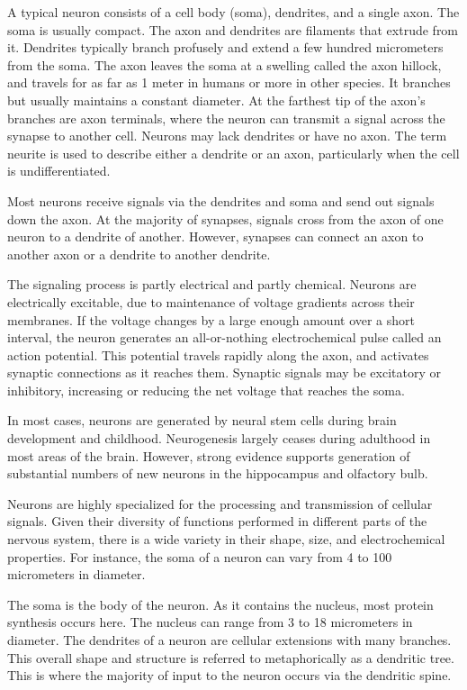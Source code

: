 A typical neuron consists of a cell body (soma), dendrites, and a single axon. The soma is usually compact. The axon and dendrites are filaments that extrude from it. Dendrites typically branch profusely and extend a few hundred micrometers from the soma. The axon leaves the soma at a swelling called the axon hillock, and travels for as far as 1 meter in humans or more in other species. It branches but usually maintains a constant diameter. At the farthest tip of the axon's branches are axon terminals, where the neuron can transmit a signal across the synapse to another cell. Neurons may lack dendrites or have no axon. The term neurite is used to describe either a dendrite or an axon, particularly when the cell is undifferentiated.

Most neurons receive signals via the dendrites and soma and send out signals down the axon. At the majority of synapses, signals cross from the axon of one neuron to a dendrite of another. However, synapses can connect an axon to another axon or a dendrite to another dendrite.

The signaling process is partly electrical and partly chemical. Neurons are electrically excitable, due to maintenance of voltage gradients across their membranes. If the voltage changes by a large enough amount over a short interval, the neuron generates an all-or-nothing electrochemical pulse called an action potential. This potential travels rapidly along the axon, and activates synaptic connections as it reaches them. Synaptic signals may be excitatory or inhibitory, increasing or reducing the net voltage that reaches the soma.

In most cases, neurons are generated by neural stem cells during brain development and childhood. Neurogenesis largely ceases during adulthood in most areas of the brain. However, strong evidence supports generation of substantial numbers of new neurons in the hippocampus and olfactory bulb.

Neurons are highly specialized for the processing and transmission of cellular signals. Given their diversity of functions performed in different parts of the nervous system, there is a wide variety in their shape, size, and electrochemical properties. For instance, the soma of a neuron can vary from 4 to 100 micrometers in diameter.

The soma is the body of the neuron. As it contains the nucleus, most protein synthesis occurs here. The nucleus can range from 3 to 18 micrometers in diameter.
The dendrites of a neuron are cellular extensions with many branches. This overall shape and structure is referred to metaphorically as a dendritic tree. This is where the majority of input to the neuron occurs via the dendritic spine.

